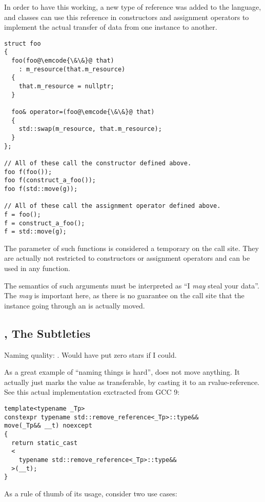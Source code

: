 In order to have this working, a new type of reference was added to
the language, and classes can use this reference in constructors and
assignment operators to implement the actual transfer of data from one
instance to another.

\begin{lstlisting}
struct foo
{
  foo(foo@\emcode{\&\&}@ that)
    : m_resource(that.m_resource)
  {
    that.m_resource = nullptr;
  }

  foo& operator=(foo@\emcode{\&\&}@ that)
  {
    std::swap(m_resource, that.m_resource);
  }
};

// All of these call the constructor defined above.
foo f(foo());
foo f(construct_a_foo());
foo f(std::move(g));

// All of these call the assignment operator defined above.
f = foo();
f = construct_a_foo();
f = std::move(g);
\end{lstlisting}

The parameter of such functions is considered a temporary on the call
site. They are actually not restricted to constructors or assignment
operators and can be used in any function.

The semantics of such arguments must be interpreted as ``I {\em may}
steal your data''. The {\em may} is important here, as there is no
guarantee on the call site that the instance going through an
 is actually moved.

\subsection{, The Subtleties}

Naming quality: \faStar\faStarO\faStarO\faStarO\faStarO. Would have
put zero stars if I could.

As a great example of ``naming things is hard'',  does
not move anything. It actually just marks the value as transferable,
by casting it to an rvalue-reference. See this actual implementation
exctracted from GCC 9:

\begin{lstlisting}
template<typename _Tp>
constexpr typename std::remove_reference<_Tp>::type&&
move(_Tp&& __t) noexcept
{
  return static_cast
  <
    typename std::remove_reference<_Tp>::type&&
  >(__t);
}
\end{lstlisting}

As a rule of thumb of its usage, consider two use cases:

